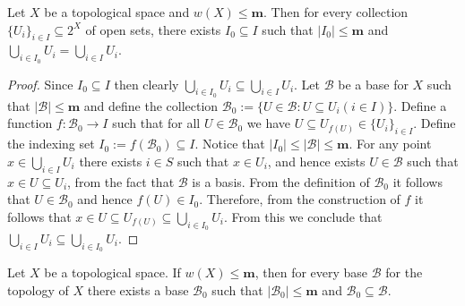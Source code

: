 \begin{proposition}\label{prop: weight m space subset union}
  Let \(X\) be a topological space and \(w(X) \leq \mathbf m\). Then for every
  collection \(\{U_i\}_{i \in I} \subseteq 2^X\) of open sets, there exists
  \(I_0 \subseteq I\) such that \(|I_0| \leq \mathbf m\) and \(\bigcup_{i \in
  I_0} U_i = \bigcup_{i \in  I} U_i\).
\end{proposition}

\begin{proof}
  Since \(I_0 \subseteq I\) then clearly \(\bigcup_{i \in  I_0} U_i \subseteq
  \bigcup_{i \in  I} U_i\). Let \(\mathcal B\) be a base for \(X\) such that
  \(|\mathcal B| \leq \mathbf m\) and define the collection \(\mathcal B_0 :=
  \{U \in \mathcal B : U \subseteq U_i (i \in I)\}\). Define a function \(f:
  \mathcal B_0 \to I\) such that for all \(U \in \mathcal B_0\) we have \(U
  \subseteq  U_{f(U)} \in \{U_i\}_{i \in I}\). Define the indexing set \(I_0 :=
  f(\mathcal B_0) \subseteq I\). Notice that \(|I_0| \leq |\mathcal B| \leq
  \mathbf m\). For any point \(x \in \bigcup_{i \in  I} U_i\) there exists \(i
  \in S\) such that \(x \in U_i\), and hence exists \(U \in \mathcal B\) such
  that \(x \in U \subseteq U_i\), from the fact that \(\mathcal B\) is a basis.
  From the definition of \(\mathcal B_0\) it follows that \(U \in \mathcal B_0\)
  and hence \(f(U) \in I_0\). Therefore, from the construction of \(f\) it
  follows that \(x \in U \subseteq U_{f(U)} \subseteq \bigcup_{i \in  I_0}
  U_i\). From this we conclude that \(\bigcup_{i \in  I} U_i \subseteq
  \bigcup_{i \in  I_0} U_i\).
\end{proof}

\begin{proposition}
  Let \(X\) be a topological space. If \(w(X) \leq \mathbf m\), then for every base
  \(\mathcal B\) for the topology of \(X\) there exists a base \(\mathcal B_0\)
  such that \(|\mathcal B_0| \leq \mathbf m\) and \(\mathcal B_0 \subseteq
  \mathcal B\).
\end{proposition}

